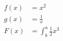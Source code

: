 \documentclass{article}
\begin{document}
\begin{align*}
f(x) &= x^2\\
g(x) &= \frac{1}{x}\\
F(x) &= \int^a_b \frac{1}{2}x^3
\end{align*}
\end{document}
